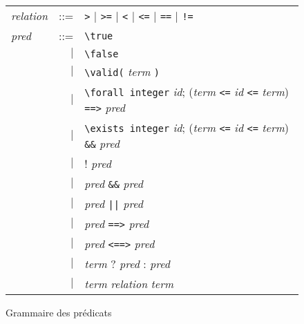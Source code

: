 \begin{figure}[tb]
  \begin{tabular}{lrl}
    \textit{relation} & ::= & \lstinline'>' $\mid$ \lstinline'>=' $\mid$
    \lstinline'<' $\mid$ \lstinline'<=' $\mid$ \lstinline'==' $\mid$
    \lstinline'!=' \\
    \textit{pred} & ::= & \lstinline'\true' \\
    & $\mid$ & \lstinline'\false' \\
    & $\mid$ & \lstinline'\valid(' \textit{term} \lstinline')' \\
    & $\mid$ & \lstinline'\forall integer' \textit{id};
    (\textit{term} \lstinline'<=' \textit{id} \lstinline'<=' \textit{term})
    \lstinline'==>' \textit{pred} \\
    & $\mid$ & \lstinline'\exists integer' \textit{id};
    (\textit{term} \lstinline'<=' \textit{id} \lstinline'<=' \textit{term})
    \lstinline'&&' \textit{pred} \\
    & $\mid$ & ! \textit{pred} \\
    & $\mid$ & \textit{pred} \lstinline'&&' \textit{pred} \\
    & $\mid$ & \textit{pred} \lstinline'||' \textit{pred} \\
    & $\mid$ & \textit{pred} \lstinline'==>' \textit{pred} \\
    & $\mid$ & \textit{pred} \lstinline'<==>' \textit{pred} \\
    & $\mid$ & \textit{term} ? \textit{pred} : \textit{pred} \\
    & $\mid$ & \textit{term} \textit{relation} \textit{term} \\
  \end{tabular}
  \caption{Grammaire des prédicats \eacsl}
  \label{fig:gram-pred}
\end{figure}

